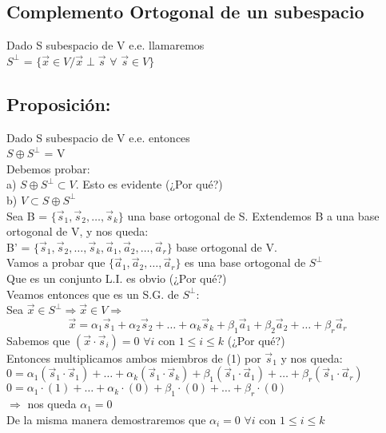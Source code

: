 \documentclass[11pt]{article}
\begin{document}
\subsection{Complemento Ortogonal de un subespacio}
Dado S subespacio de V e.e. llamaremos\\
$S^{\perp}$ = $\{\vec{x} \in V / \vec{x} \perp \vec{s}$ $\forall$ $\vec{s} \in V\}$ 
\subsection{Proposición:}
Dado S subespacio de V e.e. entonces\\
$S \oplus S^{\perp} $ = V \\
Debemos probar: \\
a) $S \oplus S^{\perp} \subset V$. Esto es evidente (¿Por qué?)\\
b) $V \subset S \oplus S^{\perp}$\\
Sea B = $\{\vec{s}_1,\vec{s}_2,\hdots,\vec{s}_k\}$ una base ortogonal de S. Extendemos B a una base ortogonal de V, y nos queda:\\
B' = $\{\vec{s}_1,\vec{s}_2,\hdots,\vec{s}_k,\vec{a}_1,\vec{a}_2,\hdots,\vec{a}_r\}$ base ortogonal de V. \\
Vamos a probar que $\{\vec{a}_1,\vec{a}_2,\hdots,\vec{a}_r\}$ es una base ortogonal de $S^{\perp}$\\
Que es un conjunto L.I. es obvio (¿Por qué?)\\
Veamos entonces que es un S.G. de $S^{\perp}$:\\
Sea $\vec{x} \in S^{\perp} \Rightarrow \vec{x} \in V \Rightarrow$
\begin{equation}
\vec{x} = \alpha_1\vec{s}_1 + \alpha_2\vec{s}_2+\hdots+\alpha_k\vec{s}_k+\beta_1\vec{a}_1+\beta_2\vec{a}_2+\hdots+\beta_r\vec{a}_r
\end{equation}
Sabemos que $(\vec{x}\cdot\vec{s}_i)=0$ $\forall i$ con $1 \leq i \leq k $ (¿Por qué?)\\
Entonces multiplicamos ambos miembros de (1) por $\vec{s}_1$ y nos queda: \\
$0=\alpha_1(\vec{s}_1\cdot\vec{s}_1) + \hdots + \alpha_k(\vec{s}_1\cdot\vec{s}_k) + \beta_1(\vec{s}_1\cdot\vec{a}_1) + \hdots + \beta_r(\vec{s}_1\cdot\vec{a}_r)$\\
$0=\alpha_1\cdot(1) + \hdots + \alpha_k\cdot(0) + \beta_1\cdot(0) + \hdots + \beta_r\cdot(0)$\\
$\Rightarrow$ nos queda $\alpha_1=0$\\
De la misma manera demostraremos que $\alpha_i = 0$ $\forall i$   con $1 \leq i \leq k$\\
\end{document}
